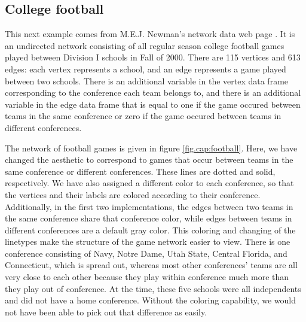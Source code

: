 \subsection{College football} %

This next example comes from M.E.J. Newman's network data web page \citep{football}.  It is an undirected network consisting of all regular season college football games played between Division I schools in Fall of 2000.  There are 115 vertices and 613 edges: each vertex represents a school, and an edge represents a game played between two schools. There is an additional variable in the vertex data frame corresponding to the conference each team belongs to, and there is an additional variable in the edge data frame that is equal to one if the game occured between teams in the same conference or zero if the game occured between teams in different conferences.

The network of football games is given in figure \ref{fig.cap:football}. Here, we have changed the  aesthetic to correspond to games that occur between teams in the same conference or different conferences.  These lines are dotted and solid, respectively. We have also assigned a different color to each conference, so that the vertices and their labels are colored according to their conference. Additionally, in the first two implementations, the edges between two teams in the same conference share that conference color, while edges between teams in different conferences are a default gray color. This coloring and changing of the linetypes make the structure of the game network easier to view.  There is one conference consisting of Navy, Notre Dame, Utah State, Central Florida, and Connecticut, which is spread out, whereas most other conferences' teams are all very close to each other because they play within conference much more than they play out of conference.  At the time, these five schools were all independents and did not have a home conference.  Without the coloring capability, we would not have been able to pick out that difference as easily.

